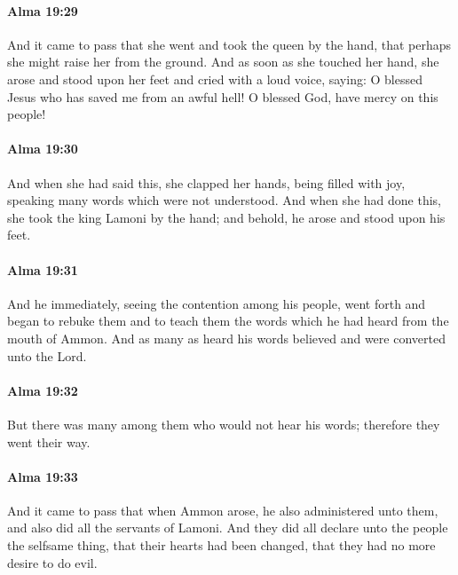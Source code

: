 		\paragraph{Alma 19:29} %
			\label{ALMA-19-29}

			And it came to pass that she went and took the queen by the hand,
			that perhaps she might raise her from the ground.
			And as soon as she touched her hand,
			she arose and stood upon her feet
			and cried with a loud voice, saying:
			O blessed Jesus who has saved me from an awful hell!
			O blessed God, have mercy on this people!

		\paragraph{Alma 19:30} %
			\label{ALMA-19-30}

			And when she had said this, she clapped her hands,
			being filled with joy,
			speaking many words which were not understood.
			And when she had done this,
			she took the king Lamoni by the hand;
			and behold, he arose and stood upon his feet.

		\paragraph{Alma 19:31} %
			\label{ALMA-19-31}

			And he immediately,
			seeing the contention among his people,
			went forth and began to rebuke them
			and to teach them the words which he had heard from the mouth of Ammon.
			And as many as heard his words believed and were converted unto the Lord.

		\paragraph{Alma 19:32} %
			\label{ALMA-19-32}

			But there was many among them who would not hear his words;
			therefore they went their way.

		\paragraph{Alma 19:33} %
			\label{ALMA-19-33}

			And it came to pass that when Ammon arose,
			he also administered unto them,
			and also did all the servants of Lamoni.
			And they did all declare unto the people the selfsame thing,
			that their hearts had been changed,
			that they had no more desire to do evil.

